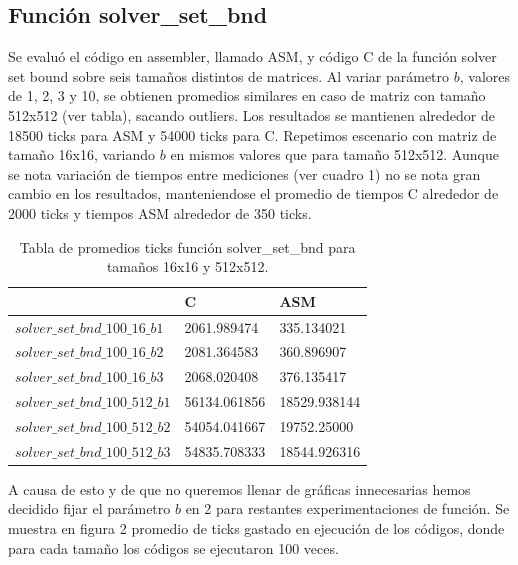 \subsection{Función solver\_set\_bnd}
\par Se evaluó el código en assembler, llamado ASM, y código C de la función solver set bound sobre seis tamaños distintos de matrices. Al variar parámetro $b$, valores de 1, 2, 3 y 10, se obtienen promedios similares en caso de matriz con tamaño 512x512 (ver tabla), sacando outliers. Los resultados se mantienen alrededor de 18500 ticks para ASM y 54000 ticks para C. 
Repetimos escenario con matriz de tamaño 16x16, variando $b$ en mismos valores que para tamaño 512x512. Aunque se nota 
variación de tiempos entre mediciones (ver cuadro 1) no se nota gran cambio en los resultados, manteniendose el promedio de tiempos C alrededor de 2000 ticks y tiempos ASM alrededor de 350 ticks.\newline
\begin{table}[htbp]
\begin{center}
\begin{tabular}{|l|l|l|}
\hline
  & C & ASM\\
\hline \hline
$solver\_set\_bnd\_100\_16\_b1$ & 2061.989474 & 335.134021\\ \hline
$solver\_set\_bnd\_100\_16\_b2$  & 2081.364583 & 360.896907\\ \hline
$solver\_set\_bnd\_100\_16\_b3$  & 2068.020408 & 376.135417 \\ 
\hline \hline
$solver\_set\_bnd\_100\_512\_b1$  & 56134.061856 & 18529.938144 \\ \hline

$solver\_set\_bnd\_100\_512\_b2$  & 54054.041667 & 19752.25000 \\ \hline

$solver\_set\_bnd\_100\_512\_b3$  &  54835.708333 & 18544.926316 \\ \hline

\end{tabular}
\caption{Tabla de promedios ticks función solver\_set\_bnd para tamaños 16x16 y 512x512.}
\end{center}
\end{table}
\par A causa de esto y de que no queremos llenar de gráficas innecesarias hemos decidido fijar el parámetro $b$ en 2 para restantes experimentaciones de función. 
Se muestra en figura 2 promedio de ticks gastado en ejecución de los códigos, donde para cada tamaño los códigos se ejecutaron 100 veces.
